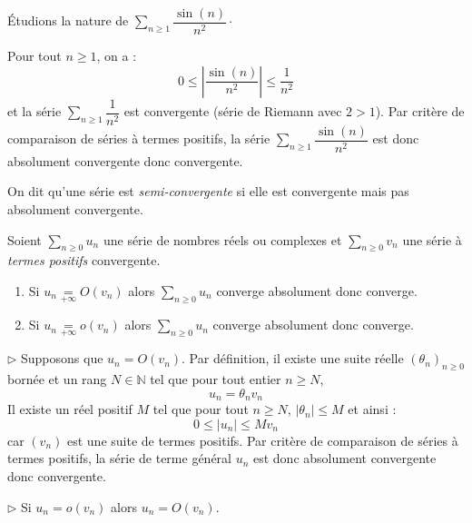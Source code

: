 \documentclass[french,11pt,twoside]{VcCours}
\newcommand{\Sum}[2]{\ensuremath{\textstyle{\sum\limits_{#1}^{#2}}}}
\begin{document}
\begin{Exemple} Étudions la nature de $\Sum{n \geq 1}{} \dfrac{\sin(n)}{n^2} \cdot$

Pour tout $n \geq 1$, on a :
$$ 0 \leq \left\vert \frac{\sin(n)}{n^2} \right\vert \leq \frac{1}{n^2}$$
et la série $\Sum{n \geq 1}{} \dfrac{1}{n^2}$ est convergente (série de Riemann avec $2>1$). Par critère de comparaison de séries à termes positifs, la série $\Sum{n \geq 1}{} \dfrac{\sin(n)}{n^2}$ est donc absolument convergente donc convergente.
\end{Exemple}

\begin{Definition}{} On dit qu'une série est \emph{semi-convergente} si elle est convergente mais pas absolument convergente.
\end{Definition}



\begin{Theoreme}{} Soient $\Sum{n \geq 0}{} u_n$ une série de nombres réels ou complexes et $\Sum{n \geq 0}{} v_n$ une série à \emph{termes positifs} convergente.

\begin{enumerate}
\item Si $u_n \underset{+ \infty}{=} O(v_n)$ alors $\Sum{n \geq 0}{} u_n$ converge absolument donc converge.
\item Si $u_n \underset{+ \infty}{=} o(v_n)$ alors $\Sum{n \geq 0}{} u_n$ converge absolument donc converge.
\end{enumerate}
\end{Theoreme}

\begin{Demonstration}{}

$\rhd$ Supposons que $u_n =O(v_n)$. Par définition, il existe une suite réelle $(\theta_n)_{n \geq 0}$ bornée et un rang $N \in \mathbb{N}$ tel que pour tout entier $n \geq N$,
$$ u_n = \theta_n v_n $$
Il existe un réel positif $M$ tel que pour tout $n \geq N$, $\vert \theta_n \vert \leq M$ et ainsi :
$$ 0 \leq \vert u_n \vert \leq M v_n$$
car $(v_n)$ est une suite de termes positifs. Par critère de comparaison de séries à termes positifs, la série de terme général $u_n$ est donc absolument convergente donc convergente.

\medskip

$\rhd$ Si $u_n = o(v_n)$ alors $u_n = O(v_n)$.
\end{Demonstration}
\end{document}
